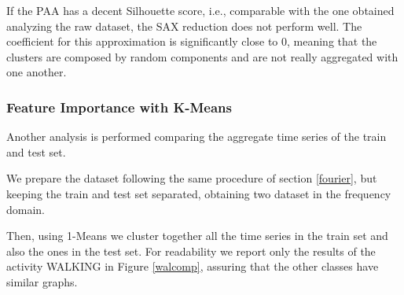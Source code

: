 \documentclass[10pt, a4paper, twocolumn]{article}
\begin{document}
If the PAA has a decent Silhouette score, i.e., comparable with the one obtained analyzing the raw dataset, the SAX reduction does not perform well. The coefficient for this approximation is significantly close to 0, meaning that the clusters are composed by random components and are not really aggregated with one another.


\subsubsection{Feature Importance with K-Means}

Another analysis is performed comparing the aggregate time series of the train and test set. 

We prepare the dataset following the same procedure of section \ref{fourier}, but keeping the train and test set separated, obtaining two dataset in the frequency domain. 

Then, using 1-Means we cluster together all the time series in the train set and also the ones in the test set. For readability we report only the results of the activity WALKING in Figure \ref{walcomp}, assuring that the other classes have similar graphs.
\end{document}
